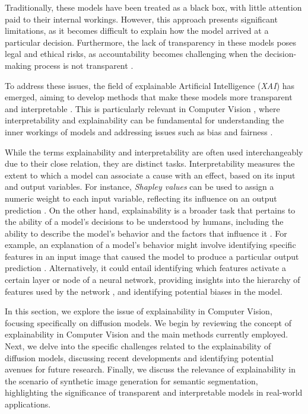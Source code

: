 Traditionally, these models have been treated as a black box, with little attention paid to their internal workings. However, this approach presents significant limitations, as it becomes difficult to explain how the model arrived at a particular decision. Furthermore, the lack of transparency in these models poses legal and ethical risks, as accountability becomes challenging when the decision-making process is not transparent \cite{Gerlings2020ReviewingTN}.

To address these issues, the field of explainable Artificial Intelligence (\emph{XAI}) has emerged, aiming to develop methods that make these models more transparent and interpretable \cite{SALEEM2022165}. This is particularly relevant in Computer Vision \cite{QuanshiZHANG}, where interpretability and explainability can be fundamental for understanding the inner workings of models and addressing issues such as bias and fairness \cite{Kirill2022}.


While the terms explainability and interpretability are often used interchangeably due to their close relation, they are distinct tasks. Interpretability measures the extent to which a model can associate a cause with an effect, based on its input and output variables. For instance, \emph{Shapley values} can be used to assign a numeric weight to each input variable, reflecting its influence on an output prediction \cite{shapley}. On the other hand, explainability is a broader task that pertains to the ability of a model's decisions to be understood by humans, including the ability to describe the model's behavior and the factors that influence it \cite{Gerlings2020ReviewingTN}. For example, an explanation of a model's behavior might involve identifying specific features in an input image that caused the model to produce a particular output prediction \cite{extremalPerturbations}. Alternatively, it could entail identifying which features activate a certain layer or node of a neural network, providing insights into the hierarchy of features used by the network \cite{optimizationInput}, and identifying potential biases in the model.

In this section, we explore the issue of explainability in Computer Vision, focusing specifically on diffusion models. We begin by reviewing the concept of explainability in Computer Vision and the main methods currently employed. Next, we delve into the specific challenges related to the explainability of diffusion models, discussing recent developments and identifying potential avenues for future research. Finally, we discuss the relevance of explainability in the scenario of synthetic image generation for semantic segmentation, highlighting the significance of transparent and interpretable models in real-world applications.

